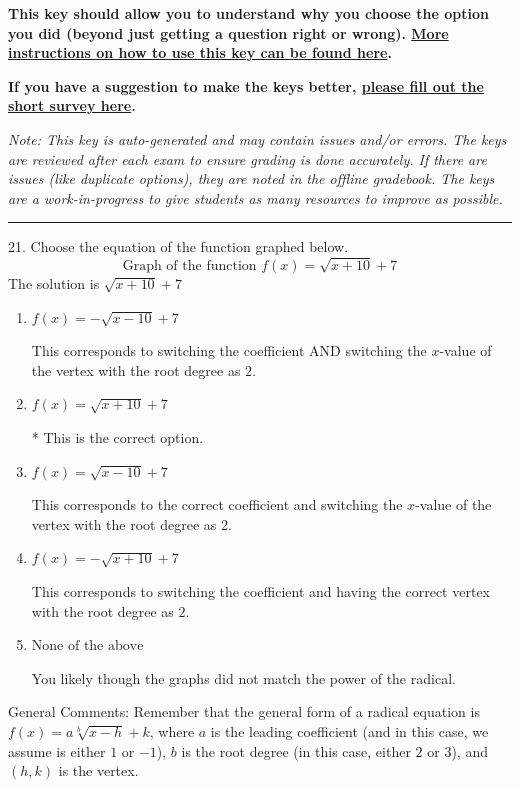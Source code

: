 \documentclass{article}[14pt]
\begin{document}
\textbf{This key should allow you to understand why you choose the option you did (beyond just getting a question right or wrong). \href{https://xronos.clas.ufl.edu/mac1105spring2020/courseDescriptionAndMisc/Exams/LearningFromResults}{More instructions on how to use this key can be found here}.}

\textbf{If you have a suggestion to make the keys better, \href{https://forms.gle/CZkbZmPbC9XALEE88}{please fill out the short survey here}.}

\textit{Note: This key is auto-generated and may contain issues and/or errors. The keys are reviewed after each exam to ensure grading is done accurately. If there are issues (like duplicate options), they are noted in the offline gradebook. The keys are a work-in-progress to give students as many resources to improve as possible.}

\rule{\textwidth}{0.4pt}

21. Choose the equation of the function graphed below.
$$ \text{Graph of the function } f(x) = \sqrt{x + 10} + 7 $$ 
The solution is $ \sqrt{x + 10} + 7 $ 

\begin{enumerate}[label=\Alph*.] 
\item $ f(x) = - \sqrt{x - 10} + 7 $ 

 This corresponds to switching the coefficient AND switching the $x$-value of the vertex with the root degree as $2$. 
\item $ f(x) = \sqrt{x + 10} + 7 $ 

 * This is the correct option. 
\item $ f(x) = \sqrt{x - 10} + 7 $ 

 This corresponds to the correct coefficient and switching the $x$-value of the vertex with the root degree as $2$. 
\item $ f(x) = - \sqrt{x + 10} + 7 $ 

 This corresponds to switching the coefficient and having the correct vertex with the root degree as $2$. 
\item $ \text{None of the above} $ 

 You likely though the graphs did not match the power of the radical. 
\end{enumerate} 
 
General Comments: Remember that the general form of a radical equation is $ f(x) = a \sqrt[b]{x - h} + k$, where $a$ is the leading coefficient (and in this case, we assume is either $1$ or $-1$), $b$ is the root degree (in this case, either $2$ or $3$), and $(h, k)$ is the vertex.
\end{document}
